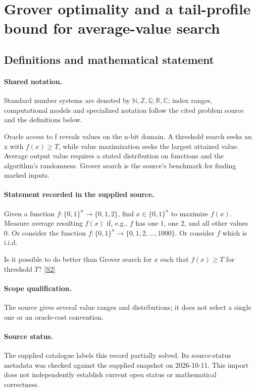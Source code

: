 \documentclass[11pt]{article}
\newcommand{\sref}[2]{\hyperlink{source:#1:#2}{[S#2]}}
\begin{document}
\section{Grover optimality and a tail-profile bound for average-value search}\label{statement}

\subsection{Definitions and mathematical statement}

\paragraph{Shared notation.}Standard number systems are denoted by $\mathbb N,\mathbb Z,\mathbb Q,\mathbb R,\mathbb C$; index ranges, computational models and specialized notation follow the cited problem source and the definitions below.


Oracle access to f reveals values on the n-bit domain. A threshold search seeks an x with $f(x)\ge T$, while value maximization seeks the largest attained value. Average output value requires a stated distribution on functions and the algorithm's randomness. Grover search is the source's benchmark for finding marked inputs.
\paragraph{Statement recorded in the supplied source.}
Given a function $f:\{0,1\}^n \to \{0,1,2\}$, find $x\in \{0,1\}^n$ to maximize $f(x)$. Measure average resulting $f(x)$ if, e.g., $f$ has one 1, one 2, and all other values 0. Or consider the function $f:\{0,1\}^n \to \{0,1,2, \dots, 1000\}$. Or consider $f$ which is i.i.d.

Is it possible to do better than Grover search for $x$ such that $f(x) \geq T$ for threshold $T$? \sref{statement}{2}
\paragraph{Scope qualification.}
The source gives several value ranges and distributions; it does not select a single one or an oracle-cost convention.
\paragraph{Source status.}
The supplied catalogue labels this record partially solved. Its source-status metadata was checked against the supplied snapshot on 2026-10-11. This import does not independently establish current open status or mathematical correctness.
\end{document}
